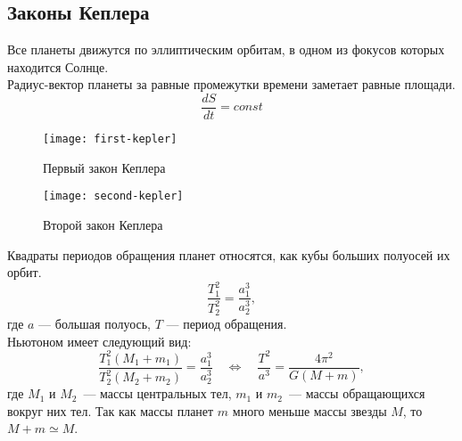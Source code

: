 \subsection{Законы Кеплера}
 Все планеты движутся по 
эллиптическим орбитам, в одном из фокусов которых 
находится Солнце.\\

 Радиус-вектор планеты за 
равные промежутки времени заметает равные площади.
\begin{equation}
\frac{dS}{dt}=const
\end{equation}
\begin{figure}[h!]
\begin{minipage}[b]{0.5\textwidth}
\centering
\texttt{[image: first-kepler]}
\caption{Первый закон Кеплера}
\end{minipage}
\begin{minipage}[b]{0.5\textwidth}
\centering
\texttt{[image: second-kepler]}
\caption {Второй закон Кеплера}
\end{minipage}
\end{figure}
 Квадраты периодов обращения планет 
относятся, как кубы больших полуосей их орбит.
\begin{equation}
\frac{T^2_1}{T^2_2}=\frac{a^3_1}{a^3_2},
\end{equation}
где $a$ --- большая полуось, $T$ --- период обращения.\\

 Ньютоном  имеет следующий вид:
\begin{equation}
\frac{T^2_1( M_1 + m_1)}{T^2_2( M_2 + m_2 )}=\frac{a^3_1}{a^3_2} \quad \Longleftrightarrow \quad 
	\frac{T^2}{a^3} = \frac{4 \pi^2}{G ( M + m )},
\end{equation}
где $M_1$ и $M_2$~--- массы центральных тел, $m_1$ и 
$m_2$~--- массы обращающихся вокруг них тел. Так как массы планет 
$m$ много меньше массы звезды $M$, то $M + m \simeq M$.
